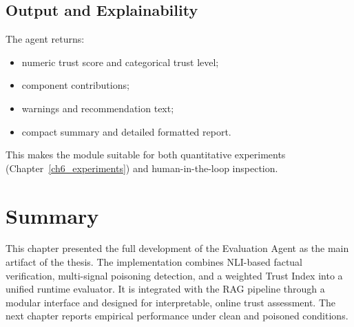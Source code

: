 \subsection{Output and Explainability}
The agent returns:
\begin{itemize}
    \item numeric trust score and categorical trust level;
    \item component contributions;
    \item warnings and recommendation text;
    \item compact summary and detailed formatted report.
\end{itemize}

This makes the module suitable for both quantitative experiments (Chapter~\ref{ch6_experiments}) and human-in-the-loop inspection.

\section{Summary}

This chapter presented the full development of the Evaluation Agent as the main artifact of the thesis. The implementation combines NLI-based factual verification, multi-signal poisoning detection, and a weighted Trust Index into a unified runtime evaluator. It is integrated with the RAG pipeline through a modular interface and designed for interpretable, online trust assessment. The next chapter reports empirical performance under clean and poisoned conditions.
